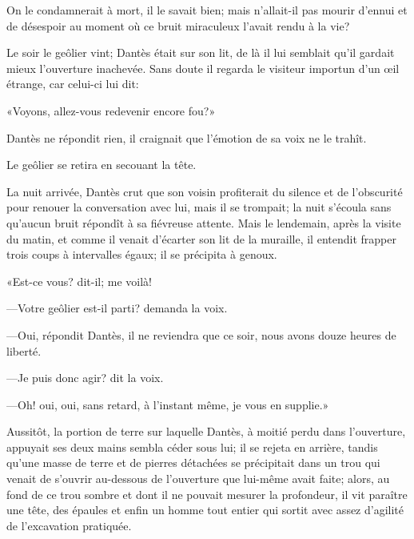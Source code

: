 On le condamnerait à mort, il le savait bien; mais n'allait-il pas mourir d'ennui et de désespoir au moment où ce bruit miraculeux l'avait rendu à la vie?

Le soir le geôlier vint; Dantès était sur son lit, de là il lui semblait qu'il gardait mieux l'ouverture inachevée. Sans doute il regarda le visiteur importun d'un œil étrange, car celui-ci lui dit:

«Voyons, allez-vous redevenir encore fou?»

Dantès ne répondit rien, il craignait que l'émotion de sa voix ne le trahît.

Le geôlier se retira en secouant la tête.

La nuit arrivée, Dantès crut que son voisin profiterait du silence et de l'obscurité pour renouer la conversation avec lui, mais il se trompait; la nuit s'écoula sans qu'aucun bruit répondît à sa fiévreuse attente. Mais le lendemain, après la visite du matin, et comme il venait d'écarter son lit de la muraille, il entendit frapper trois coups à intervalles égaux; il se précipita à genoux.

«Est-ce vous? dit-il; me voilà!

—Votre geôlier est-il parti? demanda la voix.

—Oui, répondit Dantès, il ne reviendra que ce soir, nous avons douze heures de liberté.

—Je puis donc agir? dit la voix.

—Oh! oui, oui, sans retard, à l'instant même, je vous en supplie.»

Aussitôt, la portion de terre sur laquelle Dantès, à moitié perdu dans l'ouverture, appuyait ses deux mains sembla céder sous lui; il se rejeta en arrière, tandis qu'une masse de terre et de pierres détachées se précipitait dans un trou qui venait de s'ouvrir au-dessous de l'ouverture que lui-même avait faite; alors, au fond de ce trou sombre et dont il ne pouvait mesurer la profondeur, il vit paraître une tête, des épaules et enfin un homme tout entier qui sortit avec assez d'agilité de l'excavation pratiquée.




